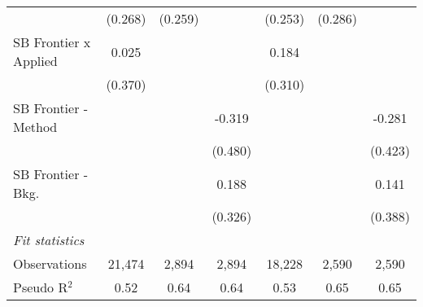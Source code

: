 \begin{tabular}{lcccccc}
                                  & (0.268)        & (0.259)       &               & (0.253)        & (0.286)       &   \\   
   SB Frontier x Applied          & 0.025          &               &               & 0.184          &               &   \\   
                                  & (0.370)        &               &               & (0.310)        &               &   \\   
   SB Frontier - Method           &                &               & -0.319        &                &               & -0.281\\   
                                  &                &               & (0.480)       &                &               & (0.423)\\   
   SB Frontier - Bkg.             &                &               & 0.188         &                &               & 0.141\\   
                                  &                &               & (0.326)       &                &               & (0.388)\\   
   \midrule
   \emph{Fit statistics}\\
   Observations                   & 21,474         & 2,894         & 2,894         & 18,228         & 2,590         & 2,590\\  
   Pseudo R$^2$                   & 0.52           & 0.64          & 0.64          & 0.53           & 0.65          & 0.65\\  
   

\end{tabular}
